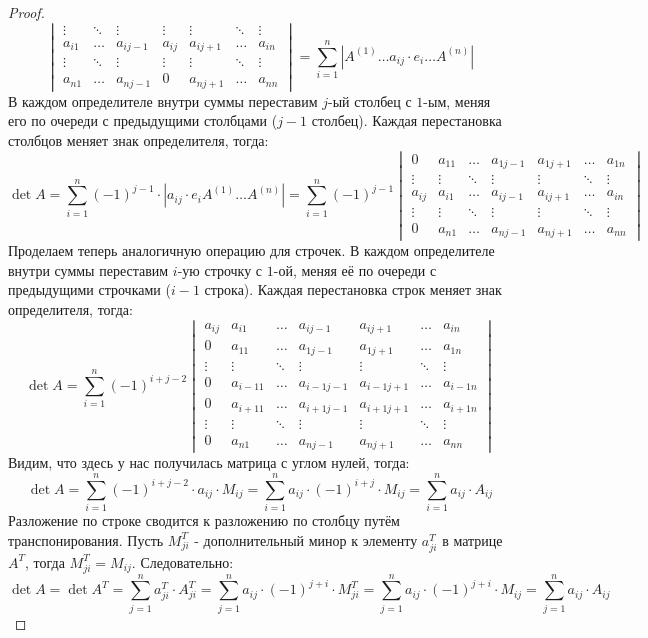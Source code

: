 \documentclass[12pt]{article}
\theoremstyle{definition}
\newcommand{\ddsum}[2]{\displaystyle\sum\limits_{#1}^{#2}}
\begin{document}
\begin{proof}
$$\begin{vmatrix}
			\vdots & \ddots & \vdots & \vdots & \vdots & \ddots  & \vdots \\
			a_{i1} & \dotsc & a_{ij-1} & a_{ij} & a_{ij+1} & \dotsc & a_{in}\\
			\vdots & \ddots & \vdots & \vdots & \vdots & \ddots  & \vdots \\
			a_{n1} & \dotsc & a_{nj-1} & 0 & a_{nj+1} & \dotsc & a_{nn}
		\end{vmatrix} = \ddsum{i = 1}{n} \left|A^{(1)} \dotsc a_{ij}{\cdot}e_i \dotsc A^{(n)}\right|
	$$
	В каждом определителе внутри суммы переставим $j$-ый столбец с $1$-ым, меняя его по очереди с предыдущими столбцами ($j-1$ столбец). Каждая перестановка столбцов меняет знак определителя, тогда:
	$$
		\det{A} = \ddsum{i = 1}{n}(-1)^{j-1}{\cdot}\left|a_{ij}{\cdot}e_i A^{(1)}\dotsc A^{(n)}\right| = \ddsum{i = 1}{n}(-1)^{j-1}	
		\begin{vmatrix}
			0& a_{11} & \dotsc & a_{1j-1} & a_{1j+1} & \dotsc & a_{1n}\\
			\vdots & \vdots & \ddots & \vdots & \vdots & \ddots  & \vdots \\
			a_{ij}& a_{i1} & \dotsc & a_{ij-1} & a_{ij+1} & \dotsc & a_{in}\\
			\vdots & \vdots & \ddots & \vdots & \vdots & \ddots  & \vdots \\
			0& a_{n1} & \dotsc & a_{nj-1} & a_{nj+1} & \dotsc & a_{nn}
		\end{vmatrix}
	$$
	Проделаем теперь аналогичную операцию для строчек. В каждом определителе внутри суммы переставим $i$-ую строчку с $1$-ой, меняя её по очереди с предыдущими строчками ($i-1$ строка). Каждая перестановка строк меняет знак определителя, тогда:
	$$
		\det{A} = \ddsum{i = 1}{n}(-1)^{i+j - 2}		
		\begin{vmatrix}
			a_{ij}& a_{i1} & \dotsc & a_{ij-1} & a_{ij+1} & \dotsc & a_{in}\\
			0& a_{11} & \dotsc & a_{1j-1} & a_{1j+1} & \dotsc & a_{1n}\\
			\vdots & \vdots & \ddots & \vdots & \vdots & \ddots  & \vdots \\
			0& a_{i-11} & \dotsc & a_{i-1j-1} & a_{i-1j+1} & \dotsc & a_{i-1n}\\
			0& a_{i+11} & \dotsc & a_{i+1j-1} & a_{i+1j+1} & \dotsc & a_{i+1n}\\
			\vdots & \vdots & \ddots & \vdots & \vdots & \ddots  & \vdots \\
			0& a_{n1} & \dotsc & a_{nj-1} & a_{nj+1} & \dotsc & a_{nn}
		\end{vmatrix}
	$$
	Видим, что здесь у нас получилась матрица с углом нулей, тогда:
	$$
		\det{A} = \ddsum{i = 1}{n}(-1)^{i + j - 2}{\cdot}a_{ij}{\cdot}M_{ij} = \ddsum{i = 1}{n}a_{ij}{\cdot}(-1)^{i + j }{\cdot}M_{ij} = \ddsum{i = 1}{n}a_{ij}{\cdot}A_{ij}
	$$
	Разложение по строке сводится к разложению по столбцу путём транспонирования. Пусть $M_{ji}^T$ - дополнительный минор к элементу $a_{ji}^T$ в матрице $A^T$, тогда $M_{ji}^T = M_{ij}$. Следовательно:
	$$
		\det{A} = \det{A^T} = \ddsum{j = 1}{n}a_{ji}^T{\cdot}A_{ji}^T = \ddsum{j = 1}{n}a_{ij}{\cdot}(-1)^{j+i}{\cdot}M_{ji}^T = \ddsum{j = 1}{n}a_{ij}{\cdot}(-1)^{j+i}{\cdot}M_{ij} = \ddsum{j = 1}{n}a_{ij}{\cdot}A_{ij}
	$$
\end{proof}
\end{document}
